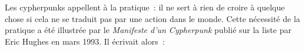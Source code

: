 %
%
%
%
%
%


Les cypherpunks appellent à la pratique~: il ne sert à rien de croire à quelque chose si cela ne se traduit pas par une action dans le monde. Cette nécessité de la pratique a été illustrée par le \emph{Manifeste d'un Cypherpunk} publié sur la liste par Eric Hughes en mars 1993. Il écrivait alors~:

